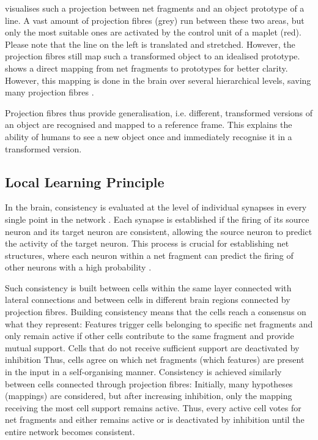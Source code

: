  visualises such a projection between net fragments and an object prototype of a line. A vast amount of projection fibres (grey) run between these two areas, but only the most suitable ones are activated by the control unit of a maplet (red).
Please note that the line on the left is translated and stretched. However, the projection fibres still map such a transformed object to an idealised prototype.
 shows a direct mapping from net fragments to prototypes for better clarity. However, this mapping is done in the brain over several hierarchical levels, saving many projection fibres .

Projection fibres thus provide generalisation, i.e. different, transformed versions of an object are recognised and mapped to a reference frame. This explains the ability of humans to see a new object once and immediately recognise it in a transformed version.


\subsection{Local Learning Principle}
In the brain, consistency is evaluated at the level of individual synapses in every single point in the network . Each synapse is established if the firing of its source neuron and its target neuron are consistent, allowing the source neuron to predict the activity of the target neuron. This process is crucial for establishing net structures, where each neuron within a net fragment can predict the firing of other neurons with a high probability .

Such consistency is built between cells within the same layer connected with lateral connections and between cells in different brain regions connected by projection fibres.
Building consistency means that the cells reach a consensus on what they represent: Features trigger cells belonging to specific net fragments and only remain active if other cells contribute to the same fragment and provide mutual support. Cells that do not receive sufficient support are deactivated by inhibition 
Thus, cells agree on which net fragments (which features) are present in the input in a self-organising manner.
Consistency is achieved similarly between cells connected through projection fibres: Initially, many hypotheses (mappings) are considered, but after increasing inhibition, only the mapping receiving the most cell support remains active.
Thus, every active cell votes for net fragments and either remains active or is deactivated by inhibition until the entire network becomes consistent.

